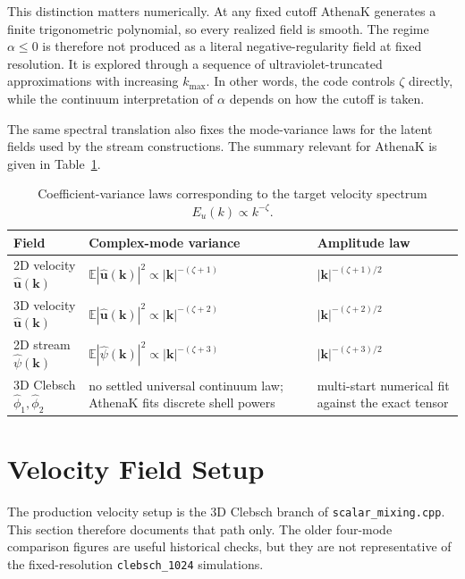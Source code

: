 \documentclass[11pt]{article}
\newcommand{\E}{\mathbb{E}}
\newcommand{\uu}{\mathbf{u}}
\newcommand{\kk}{\mathbf{k}}
\newcommand{\code}[1]{\texttt{#1}}
\begin{document}
This distinction matters numerically. At any fixed cutoff AthenaK generates a finite trigonometric polynomial, so every realized field is smooth. The regime $\alpha\le 0$ is therefore not produced as a literal negative-regularity field at fixed resolution. It is explored through a sequence of ultraviolet-truncated approximations with increasing $k_{\max}$. In other words, the code controls $\zeta$ directly, while the continuum interpretation of $\alpha$ depends on how the cutoff is taken.

The same spectral translation also fixes the mode-variance laws for the latent fields used by the stream constructions. The summary relevant for AthenaK is given in Table~\ref{tab:variance-laws}.

\begin{table}[t]
\centering
\caption{Coefficient-variance laws corresponding to the target velocity spectrum $E_u(k)\propto k^{-\zeta}$.}
\label{tab:variance-laws}
\begin{tabular}{@{}lll@{}}
\toprule
Field & Complex-mode variance & Amplitude law \\
\midrule
2D velocity $\hat{\uu}(\kk)$
& $\E |\hat{\uu}(\kk)|^2 \propto |\kk|^{-(\zeta+1)}$
& $|\kk|^{-(\zeta+1)/2}$ \\
3D velocity $\hat{\uu}(\kk)$
& $\E |\hat{\uu}(\kk)|^2 \propto |\kk|^{-(\zeta+2)}$
& $|\kk|^{-(\zeta+2)/2}$ \\
2D stream $\hat{\psi}(\kk)$
& $\E |\hat{\psi}(\kk)|^2 \propto |\kk|^{-(\zeta+3)}$
& $|\kk|^{-(\zeta+3)/2}$ \\
3D Clebsch $\hat{\phi}_1,\hat{\phi}_2$
& no settled universal continuum law;
  AthenaK fits discrete shell powers
& multi-start numerical fit against the exact tensor \\
\bottomrule
\end{tabular}
\end{table}

\section{Velocity Field Setup}
The production velocity setup is the 3D Clebsch branch of
\code{scalar\_mixing.cpp}. This section therefore documents
that path only. The older four-mode comparison figures are useful historical
checks, but they are not representative of the fixed-resolution
\code{clebsch\_1024} simulations.
\end{document}
